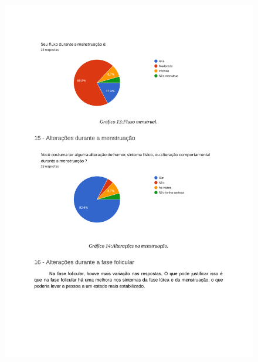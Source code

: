 \begin{apendicesenv}
        \begin{figure}[ht]
            \centering
            \includegraphics[keepaspectratio=true,scale=0.7]{figuras/Tab12.pdf}
        \end{figure}
        

\end{apendicesenv}
